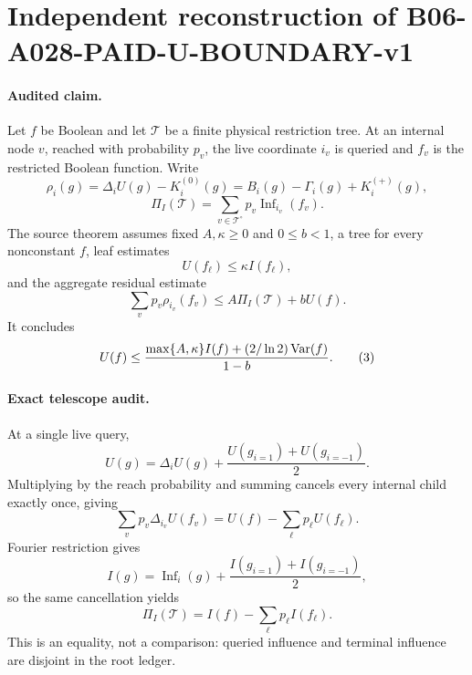 \section*{Independent reconstruction of B06-A028-PAID-U-BOUNDARY-v1}

\paragraph{Audited claim.}
Let $f$ be Boolean and let $\mathcal T$ be a finite physical restriction
tree.  At an internal node $v$, reached with probability $p_v$, the live
coordinate $i_v$ is queried and $f_v$ is the restricted Boolean function.
Write
\[
 \rho_i(g)=\Delta_iU(g)-K_i^{(0)}(g)
           =B_i(g)-\Gamma_i(g)+K_i^{(+)}(g),
\]
\[
 \Pi_I(\mathcal T)=\sum_{v\in\mathcal T^\circ}
                 p_v\operatorname{Inf}_{i_v}(f_v).
\]
The source theorem assumes fixed $A,\kappa\ge0$ and $0\le b<1$, a tree
for every nonconstant $f$, leaf estimates
\[
 U(f_\ell)\le\kappa I(f_\ell),                              \tag{1}
\]
and the aggregate residual estimate
\[
 \sum_vp_v\rho_{i_v}(f_v)\le A\Pi_I(\mathcal T)+bU(f).       \tag{2}
\]
It concludes
\[
 U(f)\le{\max\{A,\kappa\}I(f)+(2/\ln2)\operatorname{Var}(f)\over1-b}.
                                                                    \tag{3}
\]

\paragraph{Exact telescope audit.}
At a single live query,
\[
 U(g)=\Delta_iU(g)+\frac{U(g_{i=1})+U(g_{i=-1})}{2}.         \tag{4}
\]
Multiplying by the reach probability and summing cancels every internal
child exactly once, giving
\[
 \sum_vp_v\Delta_{i_v}U(f_v)
 =U(f)-\sum_\ell p_\ell U(f_\ell).                          \tag{5}
\]
Fourier restriction gives
\[
 I(g)=\operatorname{Inf}_i(g)
      +\frac{I(g_{i=1})+I(g_{i=-1})}{2},                    \tag{6}
\]
so the same cancellation yields
\[
 \Pi_I(\mathcal T)
 =I(f)-\sum_\ell p_\ell I(f_\ell).                          \tag{7}
\]
This is an equality, not a comparison: queried influence and terminal
influence are disjoint in the root ledger.

